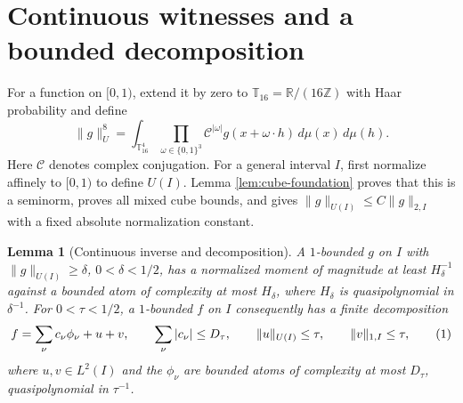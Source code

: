 \documentclass[11pt]{article}
\newtheorem{lemma}[theorem]{Lemma}
\theoremstyle{definition}
\newcommand{\R}{\mathbb R}
\newcommand{\Z}{\mathbb Z}
\newcommand{\T}{\mathbb T}
\newcommand{\eqtag}[1]{\refstepcounter{equation}\tag{\theequation}\label{#1}}
\numberwithin{equation}{section}
\begin{document}
\section{Continuous witnesses and a bounded decomposition}\label{sec:continuous}
For a function on $[0,1)$, extend it by zero to $\T_{16}=\R/(16\Z)$ with Haar probability and define
\[
 \|g\|_U^8=\int_{\T_{16}^4}\prod_{\omega\in\{0,1\}^3}
 \mathcal C^{|\omega|}g(x+\omega\cdot h)\,d\mu(x)\,d\mu(h).
\]
Here $\mathcal C$ denotes complex conjugation. For a general interval $I$, first normalize affinely to $[0,1)$ to define $U(I)$. Lemma \ref{lem:cube-foundation} proves that this is a seminorm, proves all mixed cube bounds, and gives $\|g\|_{U(I)}\le C\|g\|_{2,I}$ with a fixed absolute normalization constant.

\begin{lemma}[Continuous inverse and decomposition]\label{lem:inverse}
A $1$-bounded $g$ on $I$ with $\|g\|_{U(I)}\ge\delta$, $0<\delta<1/2$, has a normalized moment of magnitude at least $H_\delta^{-1}$ against a bounded atom of complexity at most $H_\delta$, where $H_\delta$ is quasipolynomial in $\delta^{-1}$. For $0<\tau<1/2$, a $1$-bounded $f$ on $I$ consequently has a finite decomposition
\[
 f=\sum_\nu c_\nu\phi_\nu+u+v,\qquad
 \sum_\nu|c_\nu|\le D_\tau,\qquad
 \|u\|_{U(I)}\le\tau,\qquad \|v\|_{1,I}\le\tau,
 \eqtag{eq:decomp}
\]
where $u,v\in L^2(I)$ and the $\phi_\nu$ are bounded atoms of complexity at most $D_\tau$, quasipolynomial in $\tau^{-1}$.
\end{lemma}
\end{document}
